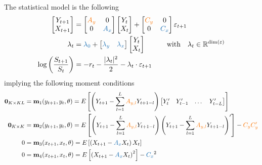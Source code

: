 \documentclass[11pt, letterpaper, notitlepage]{article}
\begin{document}
The statistical model is the following
\begin{align*}
\begin{bmatrix} 
Y_{t+1} \\ X_{t+1}
\end{bmatrix} &=  
\begin{bmatrix} 
\textcolor{orange}{A_y} & 0 \\ 0 & \textcolor{blue}{A_x}
\end{bmatrix}\begin{bmatrix} 
Y_{t} \\ X_{t}
\end{bmatrix} + 
\begin{bmatrix} 
\textcolor{orange}{C_y} & 0\\ 0 & \textcolor{blue}{C_x}
\end{bmatrix}\varepsilon_{t+1} \\
\lambda_t &= \textcolor{blue}{\lambda_0} + \begin{bmatrix} 
\textcolor{blue}{\lambda_y} & \textcolor{blue}{\lambda_x} 
\end{bmatrix}\begin{bmatrix} 
Y_{t} \\ X_{t}
\end{bmatrix} \quad\quad\quad \text{with}\quad \lambda_t \in \mathbb{R}^{\text{dim}(\varepsilon)}\\
\log\left( \frac{S_{t+1}}{S_t}\right) &= - r_t - \frac{|\lambda_t|^2}{2}  - \lambda_t \cdot  
\varepsilon_{t+1} 
\end{align*} 
implying the following moment conditions
\begin{align*}
\mathbf{0}_{K\times KL} &= \mathbf{m}_{1}(y_{t+1}, y_t, \theta) = E\left[\left(Y_{t+1} - \sum_{l=1}^{L}\textcolor{orange}{A_{y, l}} Y_{t+1-l}\right)\begin{bmatrix}
Y'_t & Y'_{t-1} & \dots & Y'_{t-L}
\end{bmatrix}\right] \\
\mathbf{0}_{K\times K} &= \mathbf{m}_{2}(y_{t+1}, y_t, \theta) = E\left[\left(Y_{t+1} - \sum_{l=1}^{L}\textcolor{orange}{A_{y, l}} Y_{t+1-l}\right)\left(Y_{t+1} - \sum_{l=1}^{L}\textcolor{orange}{A_{y, l}} Y_{t+1-l}\right)'\right] - \textcolor{orange}{C_yC_y'}\\
0 &= \mathbf{m}_{3}(x_{t+1}, x_t, \theta) = E\left[\left(X_{t+1} - \textcolor{blue}{A_{x}} X_{t}\right)X_t\right] \\
0 &= \mathbf{m}_{4}(x_{t+1}, x_t, \theta) = E\left[\left(X_{t+1} - \textcolor{blue}{A_{x}} X_{t}\right)^2\right] - \textcolor{blue}{C_x}^2\\
\end{align*}
\end{document}

